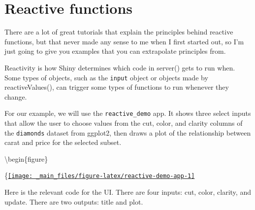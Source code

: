 \documentclass[
]{book}
\newenvironment{Shaded}{\begin{snugshade}}{\end{snugshade}}
\newcommand{\AttributeTok}[1]{\textcolor[rgb]{0.77,0.63,0.00}{#1}}
\newcommand{\ConstantTok}[1]{\textcolor[rgb]{0.00,0.00,0.00}{#1}}
\newcommand{\FunctionTok}[1]{\textcolor[rgb]{0.00,0.00,0.00}{#1}}
\newcommand{\NormalTok}[1]{#1}
\newcommand{\SpecialCharTok}[1]{\textcolor[rgb]{0.00,0.00,0.00}{#1}}
\newcommand{\StringTok}[1]{\textcolor[rgb]{0.31,0.60,0.02}{#1}}
\begin{document}
\hypertarget{reactives}{%
\chapter{Reactive functions}\label{reactives}}

There are a lot of great tutorials that explain the principles behind reactive functions, but that never made any sense to me when I first started out, so I'm just going to give you examples that you can extrapolate principles from.

Reactivity is how Shiny determines which code in server() gets to run when. Some types of objects, such as the \texttt{input} object or objects made by reactiveValues(), can trigger some types of functions to run whenever they change.

For our example, we will use the \texttt{reactive\_demo} app. It shows three select inputs that allow the user to choose values from the cut, color, and clarity columns of the \texttt{diamonds} dataset from ggplot2, then draws a plot of the relationship between carat and price for the selected subset.

\textbackslash begin\{figure\}

\{\centering \href{https://shiny.psy.gla.ac.uk/debruine/reactive_demo/}{\texttt{[image: \_main\_files/figure-latex/reactive-demo-app-1]} }

Here is the relevant code for the UI. There are four inputs: cut, color, clarity, and update. There are two outputs: title and plot.

\begin{Shaded}
\end{Shaded}
\end{document}
